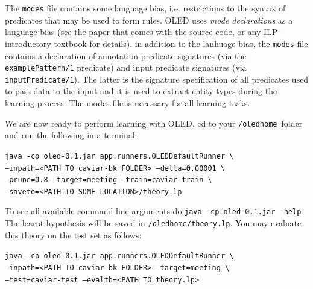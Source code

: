 \documentclass[12pt]{article}
\newcommand{\home}{\texttt{/oledhome}}
\begin{document}
The \texttt{modes} file contains some language bias, i.e. restrictions to the syntax of predicates that may be used to form rules. OLED uses \emph{mode declarations} as a language bias (see the paper that comes with the source code, or any ILP-introductory textbook for details). in addition to the lanhuage bias, the \texttt{modes} file contains a declaration of annotation predicate signatures (via the \texttt{examplePattern/1} predicate) and input predicate signatures (via \texttt{inputPredicate/1}). The latter is the signature specification of all predicates used to pass data to the input and it is used to extract entity types during the learning process. The modes file is necessary for all learning tasks.

We are now ready to perform learning with OLED. cd to your \home \ folder and run the following in a terminal:

\noindent \texttt{java -cp oled-0.1.jar app.runners.OLEDDefaultRunner \textbackslash}\\
\texttt{--inpath=<PATH TO caviar-bk FOLDER> --delta=0.00001 \textbackslash}   \\
\texttt{--prune=0.8 --target=meeting --train=caviar-train \textbackslash}\\
\texttt{--saveto=<PATH TO SOME LOCATION>/theory.lp}

To see all available command line arguments do \texttt{java -cp oled-0.1.jar -help}. The learnt hypothesis will be saved in \texttt{/oledhome/theory.lp}. You may evaluate this theory on the test set as follows: 

\noindent \texttt{java -cp oled-0.1.jar app.runners.OLEDDefaultRunner \textbackslash}\\
\texttt{--inpath=<PATH TO caviar-bk FOLDER> --target=meeting \textbackslash}   \\
\texttt{--test=caviar-test --evalth=<PATH TO theory.lp>}
\end{document}
